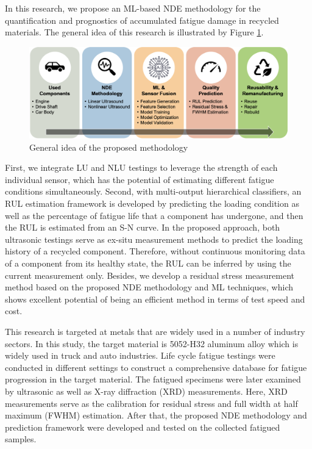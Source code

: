 In this research, we propose an ML-based NDE methodology for the quantification and prognostics of accumulated fatigue damage in recycled materials. The general idea of this research is illustrated by Figure \ref{fig: general idea}.
\begin{figure}[tb]
    \centering
    \includegraphics[width=\linewidth]{fig/general_idea.png}
    \caption{General idea of the proposed methodology}
    \label{fig: general idea}
\end{figure}
 First, we integrate LU and NLU testings to leverage the strength of each individual sensor, which has the potential of estimating different fatigue conditions simultaneously.
Second, with multi-output hierarchical classifiers,
an RUL estimation framework is developed by predicting the loading condition as well as the percentage of fatigue life that a component has undergone, and then the RUL is estimated from an S-N curve. In the proposed approach, both ultrasonic testings serve as ex-situ measurement methods to predict the loading history of a recycled component. Therefore, without continuous monitoring data of a component from its healthy state, the RUL can be inferred by using the current measurement only. Besides, we develop a residual stress measurement method based on the proposed NDE methodology and ML techniques, which shows excellent potential of being an efficient method in terms of test speed and cost.

This research is targeted at metals that are widely used in a number of industry sectors. In this study, the target material is 5052-H32 aluminum alloy which is widely used in truck and auto industries. Life cycle fatigue testings were conducted in different settings to construct a comprehensive database for fatigue progression in the target material. The fatigued specimens were later examined by ultrasonic as well as X-ray diffraction (XRD) measurements. Here, XRD measurements serve as the calibration for residual stress and full width at half maximum (FWHM) estimation. After that, the proposed NDE methodology and prediction framework were developed and tested on the collected fatigued samples.

